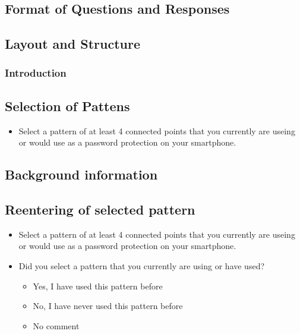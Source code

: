     \subsection{Format of Questions and Responses}
    

  \subsection{Layout and Structure}
    \subsubsection*{Introduction}

    \subsection*{Selection of Pattens}
        \begin{itemize}
            \item  Select a pattern of at least 4 connected points that you currently are useing or would use as a password protection on your smartphone. 
        \end{itemize}
    \subsection*{Background information}

    \subsection*{Reentering of selected pattern}
        \begin{itemize}
            \item Select a pattern of at least 4 connected points that you currently are useing or would use as a password protection on your smartphone. 
            \item Did you select a pattern that you currently are using or have used?
                \begin{itemize}
                    \item Yes, I have used this pattern before
                    \item No, I have never used this pattern before
                    \item No comment
                \end{itemize}
        \end{itemize}


